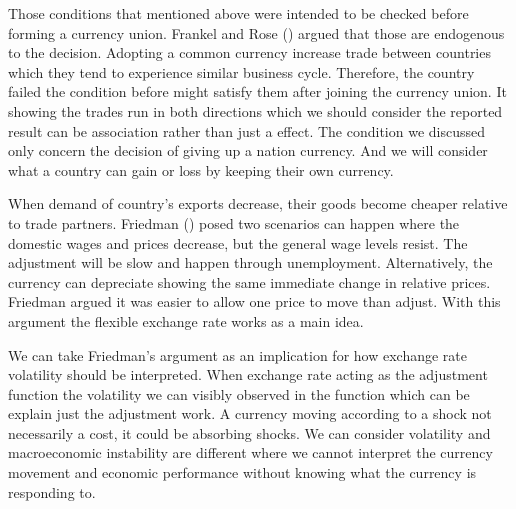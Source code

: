 \vspace{\baselineskip}

Those conditions that mentioned above were intended to be checked before forming a currency union.
Frankel and Rose (\citeyear{frankel_endogeneity_1998}) argued that those are endogenous to the decision.
Adopting a common currency increase trade between countries which they tend to experience similar business cycle.
Therefore, the country failed the condition before might satisfy them after joining the currency union.
It showing the trades run in both directions which we should consider the reported result can be association rather than just a effect.
The condition we discussed only concern the decision of giving up a nation currency. 
And we will consider what a country can gain or loss by keeping their own currency.

\vspace{\baselineskip}

When demand of country's exports decrease, their goods become cheaper relative to trade partners. 
Friedman (\citeyear{friedman_methodology_1953}) posed two scenarios can happen where the domestic wages and prices decrease, but the general wage levels resist.
The adjustment will be slow and happen through unemployment.
Alternatively, the currency can depreciate showing the same immediate change in relative prices.
Friedman argued it was easier to allow one price to move than adjust.   
With this argument the flexible exchange rate works as a main idea.

\vspace{\baselineskip}

We can take Friedman's argument as an implication for how exchange rate volatility should be interpreted.
When exchange rate acting as the adjustment function the volatility we can visibly observed in the function which can be explain just the adjustment work.
A currency moving according to a shock not necessarily a cost, it could be absorbing shocks.
We can consider volatility and macroeconomic instability are different where we cannot interpret the currency movement and economic performance without knowing what the currency is responding to.

\vspace{\baselineskip}

